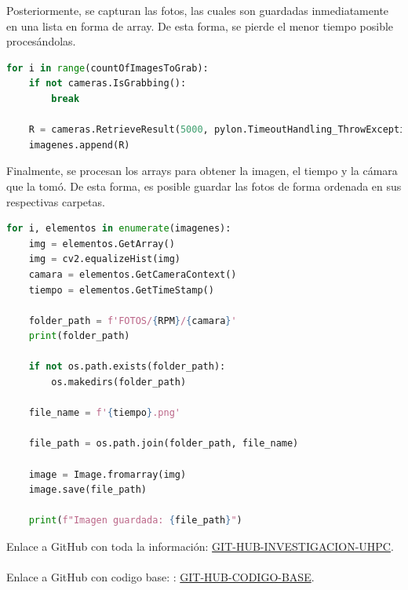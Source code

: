 \documentclass{article}
\begin{document}
\noindent Posteriormente, se capturan las fotos, las cuales son guardadas inmediatamente en una lista en forma de array. De esta forma, se pierde el menor tiempo posible procesándolas.

\begin{lstlisting}[language=Python]
  for i in range(countOfImagesToGrab):
    if not cameras.IsGrabbing():
        break

    R = cameras.RetrieveResult(5000, pylon.TimeoutHandling_ThrowException)
    imagenes.append(R)
\end{lstlisting}

\noindent Finalmente, se procesan los arrays para obtener la imagen, el tiempo y la cámara que la tomó. De esta forma, es posible guardar las fotos de forma ordenada en sus respectivas carpetas.

\begin{lstlisting}[language=Python]
  for i, elementos in enumerate(imagenes):
    img = elementos.GetArray()
    img = cv2.equalizeHist(img)
    camara = elementos.GetCameraContext()
    tiempo = elementos.GetTimeStamp()

    folder_path = f'FOTOS/{RPM}/{camara}'
    print(folder_path)

    if not os.path.exists(folder_path):
        os.makedirs(folder_path)

    file_name = f'{tiempo}.png'

    file_path = os.path.join(folder_path, file_name)

    image = Image.fromarray(img)
    image.save(file_path)

    print(f"Imagen guardada: {file_path}")
\end{lstlisting}

\noindent Enlace a GitHub con toda la información: \href{https://github.com/LukasWolff2002/SINCRONIZACION_CAMARAS_BASLER}{GIT-HUB-INVESTIGACION-UHPC}.
\\ \\
\noindent Enlace a GitHub con codigo base: : \href{https://github.com/basler/pypylon/blob/master/samples/grabmultiplecameras.py}{GIT-HUB-CODIGO-BASE}.
\end{document}
